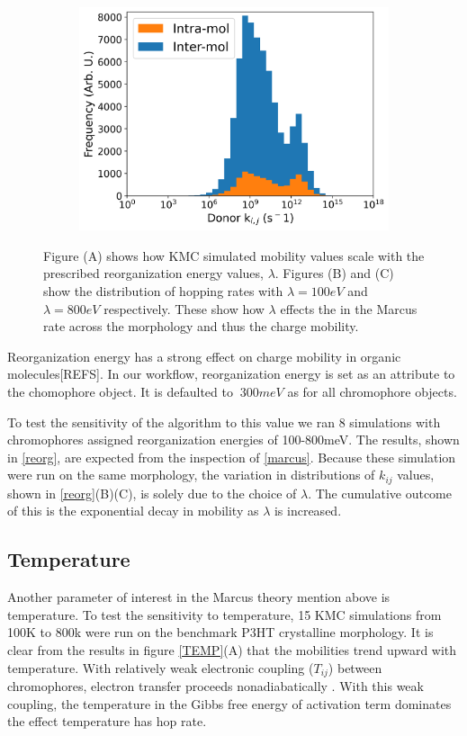 \begin{figure}
\begin{subfigure}{.5\textwidth}
    \includegraphics[width=\textwidth]{figures/donor_hopping_rate_clusters_reorg800.png}
\end{subfigure}
    \caption{Figure (A) shows how KMC simulated mobility values scale with the prescribed
    reorganization energy values, $\lambda$. Figures (B) and (C) show the distribution of hopping rates with
    $\lambda = 100eV$ and $\lambda = 800eV$ respectively. These show how $\lambda$ effects the in the Marcus
    rate across the morphology and thus the charge mobility.}
\label{reorg}
\end{figure}

Reorganization energy has a strong effect on charge mobility in organic
molecules[REFS]. In our workflow, reorganization energy is set as an attribute
to the chomophore object. It is defaulted to $~300meV$ as for all chromophore
objects.

To test the sensitivity of the algorithm to this value we ran 8
simulations with chromophores assigned reorganization energies of 100-800meV. The results, shown in
\autoref{reorg}, are expected from the inspection of \autoref{marcus}. Because these simulation were run on
the same morphology, the variation in distributions of $k_{ij}$ values, shown in \autoref{reorg}(B)(C), is
solely due to the choice of $\lambda$. The cumulative outcome of this is the exponential decay in mobility as
$\lambda$ is increased.

\subsection{Temperature}

Another parameter of interest in the Marcus theory mention above is temperature. To test the sensitivity to
temperature, 15 KMC simulations from 100K to 800k were run on the benchmark P3HT crystalline morphology. It
is clear from the results in figure \ref{TEMP}(A) that the mobilities trend upward with temperature. With relatively
weak electronic coupling ($T_{ij}$) between chromophores, electron transfer proceeds nonadiabatically
\cite{clarke2010}. With this weak coupling, the temperature in the Gibbs free energy of activation term
dominates the effect temperature has hop rate.


